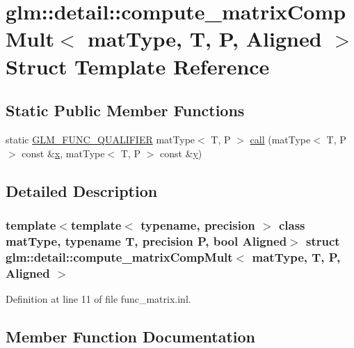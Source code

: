 \hypertarget{structglm_1_1detail_1_1compute__matrix_comp_mult}{}\section{glm\+::detail\+::compute\+\_\+matrix\+Comp\+Mult$<$ mat\+Type, T, P, Aligned $>$ Struct Template Reference}
\label{structglm_1_1detail_1_1compute__matrix_comp_mult}
\subsection*{Static Public Member Functions}
\begin{DoxyCompactItemize}
\item 
static \mbox{\hyperlink{setup_8hpp_a33fdea6f91c5f834105f7415e2a64407}{G\+L\+M\+\_\+\+F\+U\+N\+C\+\_\+\+Q\+U\+A\+L\+I\+F\+I\+ER}} mat\+Type$<$ T, P $>$ \mbox{\hyperlink{structglm_1_1detail_1_1compute__matrix_comp_mult_aa64b646145925b6436effcd85c9a5556}{call}} (mat\+Type$<$ T, P $>$ const \&\mbox{\hyperlink{glad_8h_a92d0386e5c19fb81ea88c9f99644ab1d}{x}}, mat\+Type$<$ T, P $>$ const \&\mbox{\hyperlink{glad_8h_a66ddd433d2cacfe27f5906b7e86faeed}{y}})
\end{DoxyCompactItemize}


\subsection{Detailed Description}
\subsubsection*{template$<$template$<$ typename, precision $>$ class mat\+Type, typename T, precision P, bool Aligned$>$\newline
struct glm\+::detail\+::compute\+\_\+matrix\+Comp\+Mult$<$ mat\+Type, T, P, Aligned $>$}



Definition at line 11 of file func\+\_\+matrix.\+inl.



\subsection{Member Function Documentation}
\mbox{\label{structglm_1_1detail_1_1compute__matrix_comp_mult_aa64b646145925b6436effcd85c9a5556}} 
